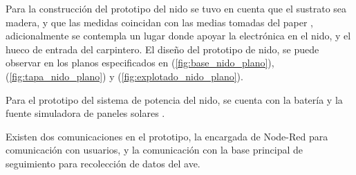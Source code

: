 Para la construcción del prototipo del nido se tuvo en cuenta que el sustrato sea madera, y que las medidas coincidan con las medias tomadas del paper \cite{ref:varepsilon_madera}, adicionalmente se contempla un lugar donde apoyar la electrónica en el nido, y el hueco de entrada del carpintero.
El diseño del prototipo de nido, se puede observar en los planos especificados en (\ref{fig:base_nido_plano}), (\ref{fig:tapa_nido_plano}) y (\ref{fig:explotado_nido_plano}).


\TBC

\TBC

Para el prototipo del sistema de potencia del nido, se cuenta con la batería \TBC y la fuente simuladora de paneles solares \TBC.

Existen dos comunicaciones en el prototipo, la encargada de Node-Red para comunicación con usuarios, y la comunicación con la base principal de seguimiento para recolección de datos del ave.
